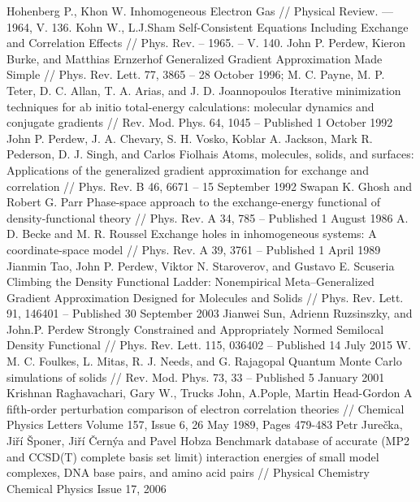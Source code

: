 
\begin{thebibliography}{3}
Hohenberg P., Khon W.  Inhomogeneous Electron Gas // Physical Review. --- 1964, V. 136.
Kohn W., L.J.Sham Self-Consistent Equations Including Exchange and Correlation Effects // Phys. Rev. – 1965. – V. 140.
John P. Perdew, Kieron Burke, and Matthias Ernzerhof Generalized Gradient Approximation Made Simple // Phys. Rev. Lett. 77, 3865 – 28 October 1996;
M. C. Payne, M. P. Teter, D. C. Allan, T. A. Arias, and J. D. Joannopoulos Iterative minimization techniques for ab initio total-energy calculations: molecular dynamics and conjugate gradients // Rev. Mod. Phys. 64, 1045 – Published 1 October 1992
John P. Perdew, J. A. Chevary, S. H. Vosko, Koblar A. Jackson, Mark R. Pederson, D. J. Singh, and Carlos Fiolhais Atoms, molecules, solids, and surfaces: Applications of the generalized gradient approximation for exchange and correlation
// Phys. Rev. B 46, 6671 – 15 September 1992
Swapan K. Ghosh and Robert G. Parr Phase-space approach to the exchange-energy functional of density-functional theory //
Phys. Rev. A 34, 785 – Published 1 August 1986
A. D. Becke and M. R. Roussel Exchange holes in inhomogeneous systems: A coordinate-space model //
Phys. Rev. A 39, 3761 – Published 1 April 1989
Jianmin Tao, John P. Perdew, Viktor N. Staroverov, and Gustavo E. Scuseria Climbing the Density Functional Ladder: Nonempirical Meta–Generalized Gradient Approximation Designed for Molecules and Solids //
Phys. Rev. Lett. 91, 146401 – Published 30 September 2003
Jianwei Sun, Adrienn Ruzsinszky, and John.P. Perdew Strongly Constrained and Appropriately Normed Semilocal Density Functional //
Phys. Rev. Lett. 115, 036402 – Published 14 July 2015
W. M. C. Foulkes, L. Mitas, R. J. Needs, and G. Rajagopal Quantum Monte Carlo simulations of solids //
Rev. Mod. Phys. 73, 33 – Published 5 January 2001
Krishnan Raghavachari, Gary W., Trucks John, A.Pople, Martin Head-Gordon A fifth-order perturbation comparison of electron correlation theories // Chemical Physics Letters
Volume 157, Issue 6, 26 May 1989, Pages 479-483
Petr Jurečka, Jiří Šponer, Jiří Černýa and Pavel Hobza Benchmark database of accurate (MP2 and CCSD(T) complete basis set limit) interaction energies of small model complexes, DNA base pairs, and amino acid pairs // Physical Chemistry Chemical Physics Issue 17, 2006

\end{thebibliography}
